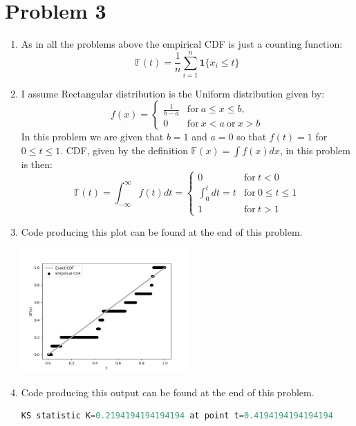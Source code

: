 \documentclass{article}
\newcommand{\field}[1]{\mathbb{#1}}
\newcommand{\1}{\mathbf{1}}
\newcommand{\F}{\field{F}} %
\begin{document}
\section*{Problem 3}
\begin{enumerate}
	\item As in all the problems above the empirical CDF is just a counting function:
	$$\F(t) = \frac{1}{n}\sum_{i=1}^n \1\{x_i\leq t\}$$
	
	\item I assume Rectangular distribution is the Uniform distribution given by:
	$$ f(x)=\begin{cases}
            \frac{1}{b - a} & \mathrm{for}\ a \le x \le b, \\
            0 & \mathrm{for}\ x<a\ \mathrm{or}\ x>b
            \end{cases}
    $$
    In this problem we are given that $b=1$ and $a=0$ so that $f(t)=1$ for $0\leq t \leq 1$. CDF, given by the definition $\F(x) = \int f(x) dx$, in this problem is then:
    $$ \F(t) = \int_{-\infty}^{\infty} f(t) dt = 
        \begin{cases}
            0 & \mathrm{for}\ t < 0 \\
            \int_0^tdt = t & \mathrm{for}\ 0 \leq t \leq 1 \\
            1 & \mathrm{for}\  t > 1
        \end{cases}
    $$
    
    \item Code producing this plot can be found at the end of this problem.
    \begin{center}
    \includegraphics[width=2.5in]{STATS509/HW2/HW2Figures/problem3.png}
    \end{center}
    
    \item Code producing this output can be found at the end of this problem.
    \begin{lstlisting}[language=Python]
        KS statistic K=0.2194194194194194 at point t=0.4194194194194194
    \end{lstlisting}

\newpage

  
    
\end{enumerate}	
	
\end{document}
